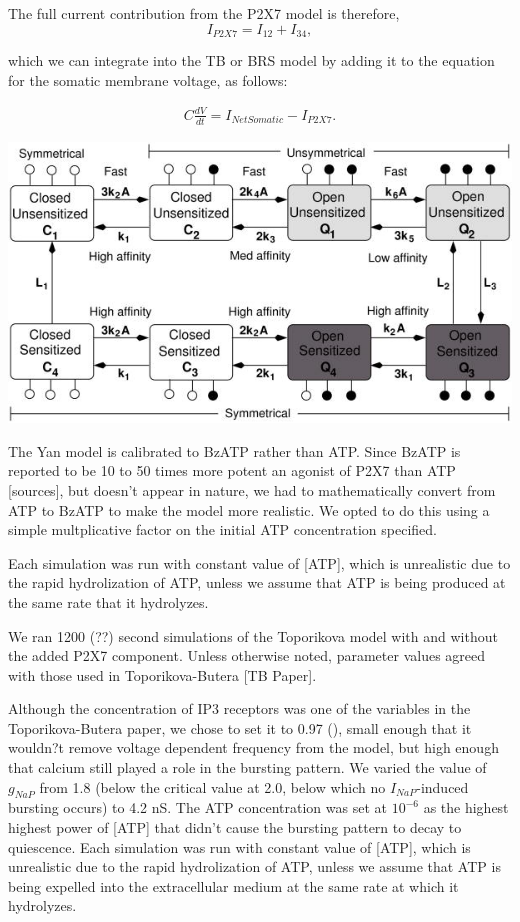 \documentclass{article}
\begin{document}
The full current contribution from the P2X7 model is therefore,
\begin{equation}
I_{P2X7} = I_{12} + I_{34},
\end{equation}

which we can integrate into the TB or BRS model by adding it to the equation for the somatic membrane voltage, as follows:

\begin{eqnarray}
C\frac{dV}{dt} = I_{Net Somatic} - I_{P2X7}.
\end{eqnarray}

\includegraphics{Yan_P2X7.jpg}

The Yan model is calibrated to BzATP rather than ATP. Since BzATP is reported to be 10 to 50 times more potent an agonist of P2X7 than ATP [sources], but doesn't appear in nature, we had to mathematically convert from ATP to BzATP to make the model more realistic. We opted to do this using a simple multplicative factor on the initial ATP concentration specified.

Each simulation was run with constant value of [ATP], which is unrealistic due to the rapid hydrolization of ATP, unless we assume that ATP is being produced at the same rate that it hydrolyzes.


We ran 1200 (??) second simulations of the Toporikova model with and without the added P2X7 component. Unless otherwise noted, parameter values agreed with those used in Toporikova-Butera [TB Paper].

Although the concentration of IP3 receptors was one of the variables in the Toporikova-Butera paper, we chose to set it to 0.97 (), small enough that it wouldn?t remove voltage dependent frequency from the model, but high enough that calcium still played a role in the bursting pattern. We varied the value of $g_{NaP}$ from 1.8 (below the critical value at 2.0, below which no $I_{NaP}$-induced bursting occurs) to 4.2 nS. The ATP concentration was set at $10^{-6}$ as the highest highest power of [ATP] that didn't cause the bursting pattern to decay to quiescence. Each simulation was run with constant value of [ATP], which is unrealistic due to the rapid hydrolization of ATP, unless we assume that ATP is being expelled into the extracellular medium at the same rate at which it hydrolyzes.
\end{document}

